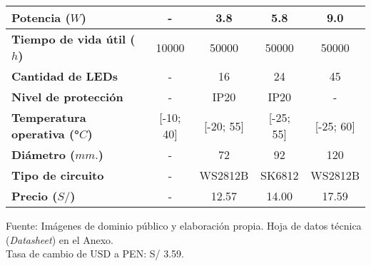 \begin{itemize}
\begin{savenotes}
\begin{mytable}[H]
\begin{tabular}{l|c|c|c|c|}
				\multicolumn{1}{|l|}{
					\begin{minipage}{\myforthmaxsizeofcontenttable}	
						\textbf{Potencia ($W$)}
					\end{minipage}
				} & - & 3.8 & 5.8 & 9.0 \\ \hline
				
				\multicolumn{1}{|l|}{
					\begin{minipage}{\myforthmaxsizeofcontenttable}	
						\textbf{Tiempo de vida útil ($h$)}
					\end{minipage}
				} & 10000 & 50000 & 50000 & 50000 \\ \hline
				
				\multicolumn{1}{|l|}{
					\begin{minipage}{\myforthmaxsizeofcontenttable}	
						\textbf{Cantidad de LEDs}
					\end{minipage}
				} & - & 16 & 24 & 45 \\ \hline
				
				\multicolumn{1}{|l|}{
					\begin{minipage}{\myforthmaxsizeofcontenttable}	
						\textbf{Nivel de protección}
					\end{minipage}
				} & - & IP20 & IP20 & - \\ \hline			
				\multicolumn{1}{|l|}{
					\begin{minipage}{\myforthmaxsizeofcontenttable}	
						\textbf{Temperatura operativa (°$C$)}
					\end{minipage}
				} & [-10; 40] & [-20; 55] & [-25; 55] & [-25; 60] \\ \hline			
				\multicolumn{1}{|l|}{
					\begin{minipage}{\myforthmaxsizeofcontenttable}	
						\textbf{Diámetro ($mm.$)}
					\end{minipage}
				} & - & 72 & 92 & 120 \\ \hline			
				\multicolumn{1}{|l|}{
					\begin{minipage}{\myforthmaxsizeofcontenttable}	
						\textbf{Tipo de circuito}
					\end{minipage}
				} & - & WS2812B & SK6812 & WS2812B \\ \hline			
				\multicolumn{1}{|l|}{
					\begin{minipage}{\myforthmaxsizeofcontenttable}	
						\textbf{Precio ($S/$)}
					\end{minipage}
				} & - & 12.57 & 14.00 & 17.59 \\ \hline
			\end{tabular}
			\begin{myflushcenteraftertable}	
				Fuente: Imágenes de dominio público y elaboración propia. Hoja de datos técnica (\textit{Datasheet}) en el Anexo.\\
				Tasa de cambio de USD a PEN: S/ 3.59.
			\end{myflushcenteraftertable}
		\end{mytable}
	\end{savenotes}
	

\end{itemize}
